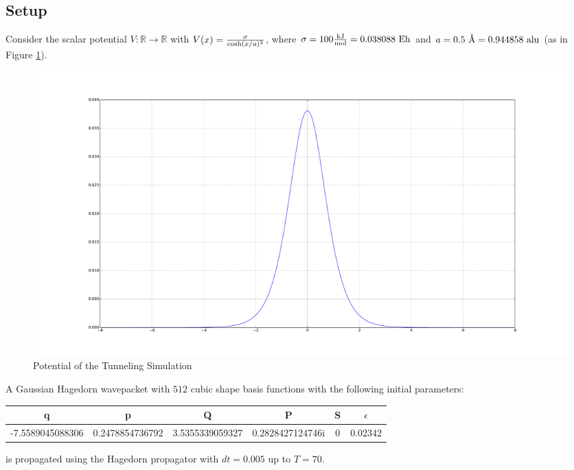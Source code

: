 \subsection{Setup}
Consider the scalar potential $V: \mathbb{R} \rightarrow \mathbb{R}$ with $V(x) = { \sigma \over \cosh(x/a)^2 }$, where $\sigma = 100 {\text{kJ} \over \text{mol}} = 0.038088 \text{ Eh}$ and $a = 0.5\text{ \r{A}} = 0.944858 \text{ alu}$ (as in Figure \ref{fig:tunneling_pot}). 
\begin{figure}
\includegraphics[width=\textwidth]{Figures/tunneling_pot.pdf}
\caption{Potential of the Tunneling Simulation}
\label{fig:tunneling_pot}
\end{figure}
\FloatBarrier

A Gaussian Hagedorn wavepacket with $512$ cubic shape basis functions with the following initial parameters:
\begin{center}
 \begin{tabular}{|c c c c c c|} 
 \hline
 q & p & Q & P & S & $\epsilon$\\ [0.5ex] 
 \hline
 -7.5589045088306 & 0.2478854736792 & 3.5355339059327 & 0.2828427124746i & 0 & 0.02342\\ 
 \hline
\end{tabular}
\end{center}
is propagated using the Hagedorn propagator with $dt = 0.005$ up to $T = 70$.

